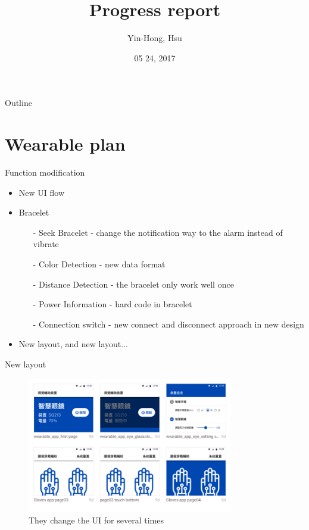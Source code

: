 \documentclass{beamer}
\title {
    Progress report
}
\author {
    Yin-Hong, Hsu
}
\date {
    05 24, 2017
}
\begin{document}
\begin{frame}
    \titlepage
\end{frame}


\begin{frame}{Outline}
    \tableofcontentsgather
    \tableofcontents
\end{frame}

\section{Wearable plan}

\begin{frame}{Function modification}
    \begin{itemize}
        \item {New UI flow}
        \item {Bracelet}
        \begin{itemize}    
            \item[-]{Seek Bracelet - change the notification way to the alarm instead of vibrate}
            \item[-]{Color Detection - new data format}
            \item[-]{Distance Detection - the bracelet only work well once}
            \item[-]{Power Information - hard code in bracelet}
            \item[-]{Connection switch - new connect and disconnect approach in new design}
        \end{itemize}
        \item {New layout, and new layout...}
    \end{itemize}
\end{frame}
\begin{frame} {New layout}  
    \begin{figure}[t]
    \centering
    \includegraphics[width=0.8\textwidth]{figures/layout.png}
    \caption{They change the UI for several times}
    \end{figure}
\end{frame}
\end{document}
